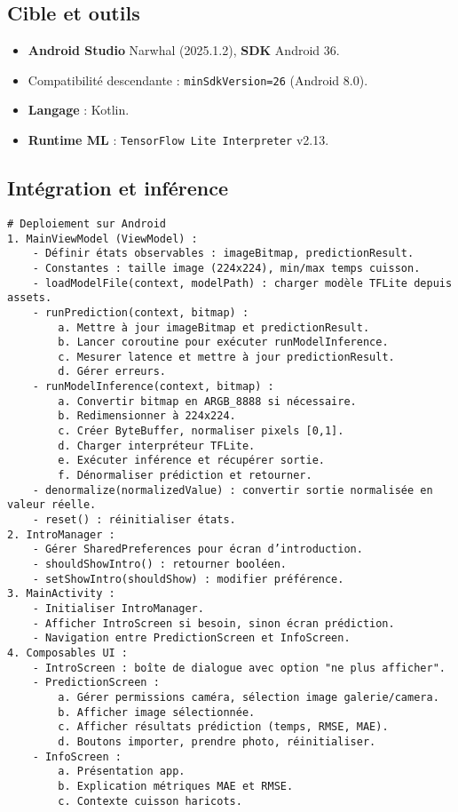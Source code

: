 \subsection{Cible et outils}
\begin{itemize}
	\item \textbf{Android Studio} Narwhal (2025.1.2), \textbf{SDK} Android 36.
	\item Compatibilité descendante : \texttt{minSdkVersion=26} (Android 8.0).
	\item \textbf{Langage} : Kotlin.
	\item \textbf{Runtime ML} : \texttt{TensorFlow Lite Interpreter} v2.13.
\end{itemize}

\subsection{Intégration et inférence}

\begin{verbatim}
# Deploiement sur Android 
1. MainViewModel (ViewModel) :
    - Définir états observables : imageBitmap, predictionResult.
    - Constantes : taille image (224x224), min/max temps cuisson.
    - loadModelFile(context, modelPath) : charger modèle TFLite depuis assets.
    - runPrediction(context, bitmap) :
        a. Mettre à jour imageBitmap et predictionResult.
        b. Lancer coroutine pour exécuter runModelInference.
        c. Mesurer latence et mettre à jour predictionResult.
        d. Gérer erreurs.
    - runModelInference(context, bitmap) :
        a. Convertir bitmap en ARGB_8888 si nécessaire.
        b. Redimensionner à 224x224.
        c. Créer ByteBuffer, normaliser pixels [0,1].
        d. Charger interpréteur TFLite.
        e. Exécuter inférence et récupérer sortie.
        f. Dénormaliser prédiction et retourner.
    - denormalize(normalizedValue) : convertir sortie normalisée en valeur réelle.
    - reset() : réinitialiser états.
2. IntroManager :
    - Gérer SharedPreferences pour écran d’introduction.
    - shouldShowIntro() : retourner booléen.
    - setShowIntro(shouldShow) : modifier préférence.
3. MainActivity :
    - Initialiser IntroManager.
    - Afficher IntroScreen si besoin, sinon écran prédiction.
    - Navigation entre PredictionScreen et InfoScreen.
4. Composables UI :
    - IntroScreen : boîte de dialogue avec option "ne plus afficher".
    - PredictionScreen :
        a. Gérer permissions caméra, sélection image galerie/camera.
        b. Afficher image sélectionnée.
        c. Afficher résultats prédiction (temps, RMSE, MAE).
        d. Boutons importer, prendre photo, réinitialiser.
    - InfoScreen :
        a. Présentation app.
        b. Explication métriques MAE et RMSE.
        c. Contexte cuisson haricots.
\end{verbatim}

